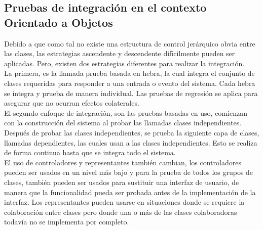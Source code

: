 \subsection{Pruebas de integración en el contexto Orientado a Objetos}
Debido a que como tal no existe una estructura de control jerárquico obvia entre las clases, las estrategias ascendente y descendente difícilmente pueden ser aplicadas. Pero, existen dos estrategias diferentes para realizar la integración.\\
La primera, es la llamada prueba basada en hebra, la cual integra el conjunto de clases requeridas para responder a una entrada o evento del sistema. Cada hebra se integra y prueba de manera individual. Las pruebas de regresión se aplica para asegurar que no ocurran efectos colaterales.\\ El segundo enfoque de integración, son las pruebas basadas en uso, comienzan con la construcción del sistema al probar las llamadas clases independientes. Después de probar las clases independientes, se prueba la siguiente capa de clases, llamadas dependientes, las cuales usan a las clases independientes. Esto se realiza de forma continua hasta que se integra todo el sistema.\\
El uso de controladores y representantes también cambian, los controladores pueden ser usados en un nivel más bajo y para la prueba de todos los grupos de clases, también pueden ser usados para sustituir una interfaz de usuario, de manera que la funcionalidad pueda ser probada antes de la implementación de la interfaz. Los representantes pueden usarse en situaciones donde se requiere la colaboración entre clases pero donde una o más de las clases colaboradoras todavía no se implementa por completo. 
